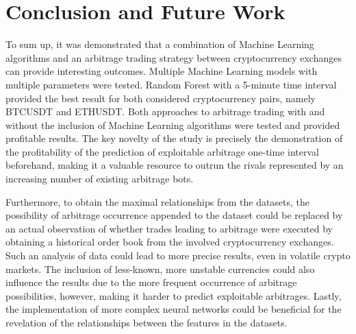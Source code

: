 \documentclass[conference,comsoc,10pt]{IEEEtran}
\begin{document}
\section{Conclusion and Future Work}
To sum up, it was demonstrated that a combination of Machine Learning algorithms and an arbitrage trading strategy between cryptocurrency exchanges can provide interesting outcomes. Multiple Machine Learning models with multiple parameters were tested. Random Forest with a 5-minute time interval provided the best result for both considered cryptocurrency pairs, namely BTCUSDT and ETHUSDT. Both approaches to arbitrage trading with and without the inclusion of Machine Learning algorithms were tested and provided profitable results. The key novelty of the study is precisely the demonstration of the profitability of the prediction of exploitable arbitrage one-time interval beforehand, making it a valuable resource to outrun the rivals represented by an increasing number of existing arbitrage bots.

Furthermore, to obtain the maximal relationships from the datasets, the possibility of arbitrage occurrence appended to the dataset could be replaced by an actual observation of whether trades leading to arbitrage were executed by obtaining a historical order book from the involved cryptocurrency exchanges. Such an analysis of data could lead to more precise results, even in volatile crypto markets. The inclusion of less-known, more unstable currencies could also influence the results due to the more frequent occurrence of arbitrage possibilities, however, making it harder to predict exploitable arbitrages. Lastly, the implementation of more complex neural networks could be beneficial for the revelation of the relationships between the features in the datasets.
\end{document}
